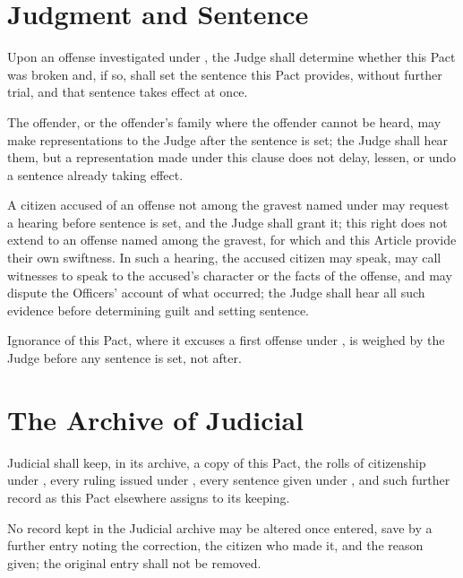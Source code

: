 \section{Judgment and Sentence}
\label{sec:judicial:judgment-and-sentence}

Upon an offense investigated under , the Judge shall determine whether this Pact was broken and, if so, shall set the sentence this Pact provides, without further trial, and that sentence takes effect at once.

\begin{clauses}
\item The offender, or the offender's family where the offender cannot be heard, may make representations to the Judge after the sentence is set; the Judge shall hear them, but a representation made under this clause does not delay, lessen, or undo a sentence already taking effect.
\item A citizen accused of an offense not among the gravest named under  may request a hearing before sentence is set, and the Judge shall grant it; this right does not extend to an offense named among the gravest, for which  and this Article provide their own swiftness. In such a hearing, the accused citizen may speak, may call witnesses to speak to the accused's character or the facts of the offense, and may dispute the Officers' account of what occurred; the Judge shall hear all such evidence before determining guilt and setting sentence.
\item Ignorance of this Pact, where it excuses a first offense under , is weighed by the Judge before any sentence is set, not after.
\end{clauses}

\section{The Archive of Judicial}
\label{sec:judicial:archive-of-judicial}

Judicial shall keep, in its archive, a copy of this Pact, the rolls of citizenship under , every ruling issued under , every sentence given under , and such further record as this Pact elsewhere assigns to its keeping.

\begin{clauses}
\item No record kept in the Judicial archive may be altered once entered, save by a further entry noting the correction, the citizen who made it, and the reason given; the original entry shall not be removed.
\end{clauses}

